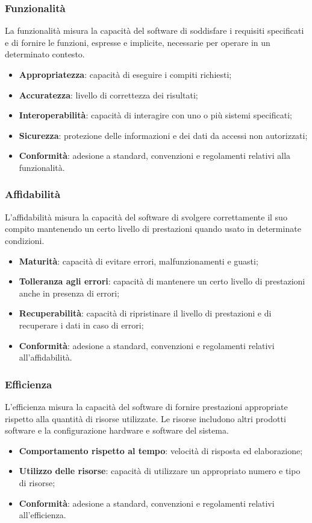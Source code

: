 \subsubsection{Funzionalità}
La funzionalità misura la capacità del software di soddisfare i requisiti specificati e di fornire le funzioni,
espresse e implicite, necessarie per operare in un determinato contesto.
\begin{itemize}
    \item \textbf{Appropriatezza}: capacità di eseguire i compiti richiesti;
    \item \textbf{Accuratezza}: livello di correttezza dei risultati;
    \item \textbf{Interoperabilità}: capacità di interagire con uno o più sistemi specificati;
    \item \textbf{Sicurezza}: protezione delle informazioni e dei dati da accessi non autorizzati;
    \item \textbf{Conformità}: adesione a standard, convenzioni e regolamenti relativi alla funzionalità.
\end{itemize}

\subsubsection{Affidabilità}
L'affidabilità misura la capacità del software di svolgere correttamente il suo compito
mantenendo un certo livello di prestazioni quando usato in determinate condizioni.
\begin{itemize}
    \item \textbf{Maturità}: capacità di evitare errori, malfunzionamenti e guasti;
    \item \textbf{Tolleranza agli errori}: capacità di mantenere un certo livello di prestazioni anche in presenza di errori;
    \item \textbf{Recuperabilità}: capacità di ripristinare il livello di prestazioni e di recuperare
        i dati in caso di errori;
    \item \textbf{Conformità}: adesione a standard, convenzioni e regolamenti relativi all'affidabilità.
\end{itemize}

\subsubsection{Efficienza}
L'efficienza misura la capacità del software di fornire prestazioni appropriate rispetto alla quantità di risorse utilizzate.
Le risorse includono altri prodotti software e la configurazione hardware e software del sistema.
\begin{itemize}
    \item \textbf{Comportamento rispetto al tempo}: velocità di risposta ed elaborazione;
    \item \textbf{Utilizzo delle risorse}: capacità di utilizzare un appropriato numero e tipo di risorse;
    \item \textbf{Conformità}: adesione a standard, convenzioni e regolamenti relativi all'efficienza.
\end{itemize}

